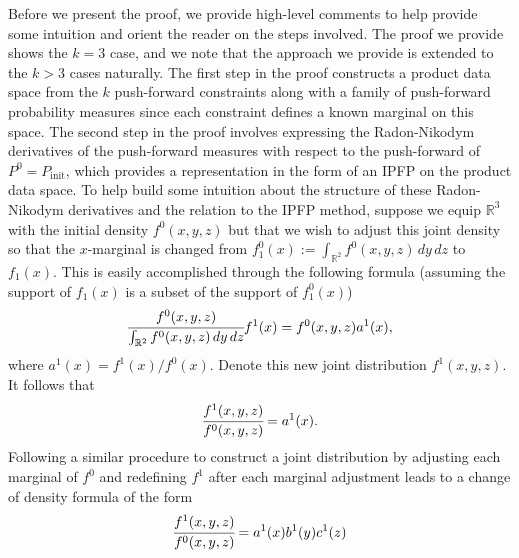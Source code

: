 \documentclass{article}
\newcommand{\initmeas}{P_{\text{init}}}
\begin{document}
Before we present the proof, we provide high-level comments to help provide some intuition and orient the reader on the steps involved.
The proof we provide shows the $k=3$ case, and we note that the approach we provide is extended to the $k>3$ cases naturally. 
The first step in the proof constructs a product data space from the $k$ push-forward constraints along with a family of push-forward probability measures since each constraint defines a known marginal on this space. 
The second step in the proof involves expressing the Radon-Nikodym derivatives of the push-forward measures with respect to the push-forward of $P^0=\initmeas$, which provides a representation in the form of an IPFP on the product data space. 
To help build some intuition about the structure of these Radon-Nikodym derivatives and the relation to the IPFP method, suppose we equip $\mathbb{R}^3$ with the initial density $f^0(x,y,z)$ but that we wish to adjust this joint density so that the $x$-marginal is changed from $f^0_1(x):=\int_{\mathbb{R}^2}f^0(x,y,z)\, dy\, dz$ to $f_1(x)$.
This is easily accomplished through the following formula (assuming the support of $f_1(x)$ is a subset of the support of $f^0_1(x)$)
\begin{equation*}
    \cfrac{f^0(x,y,z)}{\int_{\mathbb{R}^2} f^0(x,y,z)\, dy\, dz}f^1(x) = f^0(x,y,z) a^1(x), 
\end{equation*}
where $a^1(x)=f^1(x)/f^0(x)$. 
Denote this new joint distribution $f^1(x,y,z)$. 
It follows that
\begin{equation*}
    \cfrac{f^1(x,y,z)}{f^0(x,y,z)} = a^1(x). 
\end{equation*}
Following a similar procedure to construct a joint distribution by adjusting each marginal of $f^0$ and redefining $f^1$ after each marginal adjustment leads to a change of density formula of the form
\begin{equation*}
    \cfrac{f^1(x,y,z)}{f^0(x,y,z)} = a^1(x)b^1(y)c^1(z)
\end{equation*}
\end{document}
